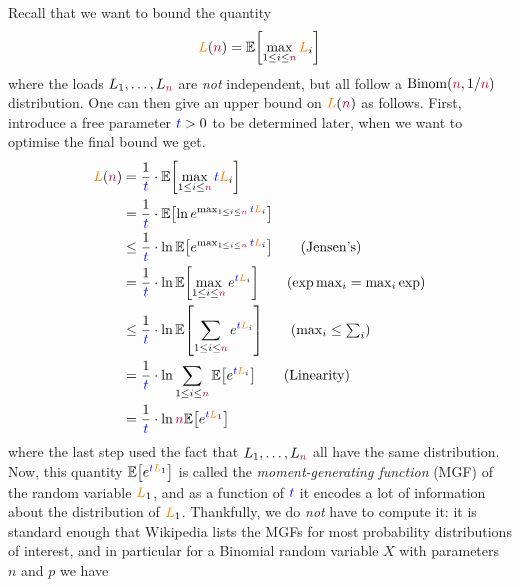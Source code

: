 Recall that we want to bound the quantity
\[
\orange{L}(\nbins) = \expect{\max_{1\leq i\leq \nbins} \orange{L}_i}
\]
where the loads $L_1,\dots,L_{\textcolor{purple}{n}}$ are \emph{not} independent, but all follow a $\operatorname{Binom}(\textcolor{purple}{n}, 1/\textcolor{purple}{n})$ distribution. One can then give an upper bound on $\textcolor{orange}{L}(\textcolor{purple}{n})$ as follows.
First, introduce a free parameter $\textcolor{blue}{t}>0$ to be determined later, when we want to optimise the final bound we get.
\begin{align}
    \orange{L}(\nbins) &= \frac{1}{\blue{t}}\cdot \expect{\max_{1\leq i\leq \nbins} \blue{t}\orange{L}_i} \notag\\
    &= \frac{1}{\blue{t}}\cdot \expect{\ln e^{\max_{1\leq i\leq \nbins} \blue{t}\orange{L}_i}} \notag\\
    &\leq \frac{1}{\blue{t}}\cdot \ln\expect{ e^{\max_{1\leq i\leq \nbins} \blue{t}\orange{L}_i}} \tag{Jensen's}\\
    &= \frac{1}{\blue{t}}\cdot \ln\expect{\max_{1\leq i\leq \nbins} e^{\blue{t}\orange{L}_i}} \tag{$\exp{\max_i} = \max_i \exp$}\\
    &\leq \frac{1}{\blue{t}}\cdot \ln\expect{\sum_{1\leq i\leq \nbins} e^{\blue{t}\orange{L}_i}} \tag{$\max_i\leq \sum_i$}\\
    &= \frac{1}{\blue{t}}\cdot \ln \sum_{1\leq i\leq \nbins} \expect{e^{\blue{t}\orange{L}_i}} \tag{Linearity}\\
    &= \frac{1}{\blue{t}}\cdot \ln \nbins \expect{e^{\blue{t}\orange{L}_1}} \label{eq:mgf:maxload}%
\end{align}
where the last step used the fact that $L_1,\dots, L_{\textcolor{purple}{n}}$ all have the same distribution. Now, this quantity $\expect{e^{\blue{t}\orange{L}_1}}$ is called the \emph{moment-generating function} (MGF) of the random variable $\textcolor{orange}{L}_1$, and as a function of $\textcolor{blue}{t}$ it encodes a lot of information about the distribution of $\textcolor{orange}{L}_1$. Thankfully, we do \emph{not} have to compute it: it is standard enough that Wikipedia lists the MGFs for most probability distributions of interest, and in particular for a Binomial random variable $X$ with parameters $n$ and $p$ we have
